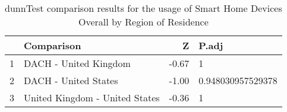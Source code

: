 \begin{table}[ht]
\centering
\begin{tabular}{rlrl}
  \hline
 & Comparison & Z & P.adj \\ 
  \hline
1 & DACH - United Kingdom & -0.67 & 1   \\ 
  2 & DACH - United States & -1.00 & 0.948030957529378   \\ 
  3 & United Kingdom - United States & -0.36 & 1   \\ 
   \hline
\end{tabular}
\caption{dunnTest comparison results for the usage of Smart Home Devices Overall by Region of Residence} 
\end{table}
